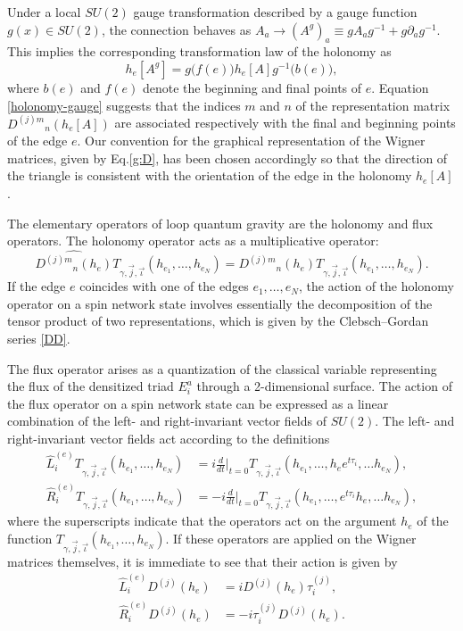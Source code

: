\documentclass[graybox, secnum]{svmult}
\makeatletter
\newcommand{\Eq}[1]{Eq.\@\xspace\eqref{#1}}
\newcommand{\idx}[1]{#1}
\newcommand{\DD}[4]{{D^{(#1)#2}}_{#3}(#4)}
\makeatother
\begin{document}
Under a local $SU(2)$ gauge transformation described by a gauge function $g(x) \in SU(2)$, the connection behaves as $A_a \to (A^g)_a \equiv gA_ag^{-1} + g\partial_ag^{-1}$. This implies the corresponding transformation law of the holonomy as
\begin{equation}
h_e[A^g] = g\bigl(f(e)\bigr)h_e[A]g^{-1}\bigl(b(e)\bigr),
\label{holonomy-gauge}
\end{equation}
where $b(e)$ and $f(e)$ denote the beginning and final points of $e$. Equation \eqref{holonomy-gauge} suggests that the indices $m$ and $n$ of the representation matrix $\DD{j}{m}{n}{h_e[A]}$ are associated respectively with the final and beginning points of the edge $e$. Our convention for the graphical representation of the Wigner matrices, given by \Eq{g:D}, has been chosen accordingly so that the direction of the triangle is consistent with the orientation of the edge in the holonomy $h_e[A]$.

The elementary operators of loop quantum gravity are the holonomy and flux operators. The \idx{holonomy operator} acts as a multiplicative operator:
\begin{equation}
	\widehat{\DD{j}{m}{n}{h_e}} T_{\gamma,\vec{j},\vec{\iota}}(h_{e_1}, \dots, h_{e_N}) = \DD{j}{m}{n}{h_e}T_{\gamma,\vec{j},\vec{\iota}}(h_{e_1}, \dots, h_{e_N}).
	\label{}
\end{equation}
If the edge $e$ coincides with one of the edges $e_1, \dots, e_N$, the action of the holonomy operator on a spin network state involves essentially the decomposition of the tensor product of two representations, which is given by the Clebsch--Gordan series \eqref{DD}.

The flux operator arises as a quantization of the classical variable representing the flux of the densitized triad $E^a_i$ through a 2-dimensional surface. The action of the flux operator on a spin network state can be expressed as a linear combination of the \idx{left-} and right-\idx{invariant vector fields} of $SU(2)$. The left- and \idx{right-invariant vector fields} act according to the definitions
\begin{align}
	\hat L_i^{(e)}T_{\gamma, \vec j, \vec\iota}(h_{e_1}, \dots, h_{e_N}) &= i\frac{d}{dt}\bigg|_{t=0}T_{\gamma, \vec j, \vec\iota}(h_{e_1}, \dots, h_ee^{t\tau_i}, \dots h_{e_N}), \label{L_i} \\
	\hat R_i^{(e)}T_{\gamma, \vec j, \vec\iota}(h_{e_1}, \dots, h_{e_N}) &= -i\frac{d}{dt}\bigg|_{t=0}T_{\gamma, \vec j, \vec\iota}(h_{e_1}, \dots, e^{t\tau_i}h_e, \dots h_{e_N}), \label{R_i}
\end{align}
where the superscripts indicate that the operators act on the argument $h_e$ of the function $T_{\gamma, \vec j, \vec\iota}(h_{e_1}, \dots, h_{e_N})$. If these operators are applied on the Wigner matrices themselves, it is immediate to see that their action is given by
\begin{align}
	\hat L_i^{(e)}D^{(j)}(h_e) &= iD^{(j)}(h_e)\tau_i^{(j)}, \label{L*D} \\
	\hat R_i^{(e)}D^{(j)}(h_e) &= -i\tau_i^{(j)}D^{(j)}(h_e). \label{R*D}
\end{align}
\end{document}
